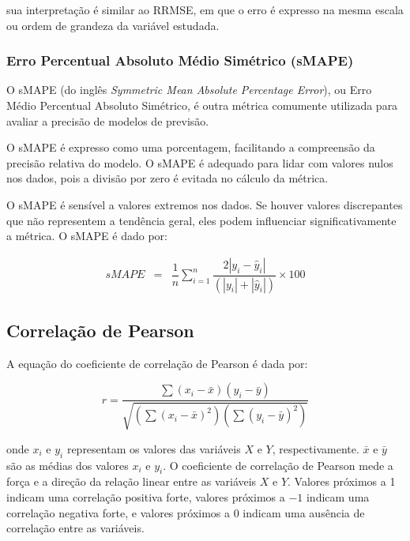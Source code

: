  \noindent sua interpretação é similar ao RRMSE, em que o erro é expresso na mesma escala ou ordem de grandeza da variável estudada.
 
 
 
 
 \subsubsection{Erro Percentual Absoluto M\'edio Sim\'etrico (sMAPE)}
 
 
 O sMAPE (do inglês \textit{Symmetric Mean Absolute Percentage Error}), ou Erro Médio Percentual Absoluto Simétrico, é outra métrica comumente utilizada para avaliar a precisão de modelos de previsão. 
 
 O sMAPE é expresso como uma porcentagem, facilitando a compreensão da precisão relativa do modelo.  O sMAPE é adequado para lidar com valores nulos nos dados, pois a divisão por zero é evitada no cálculo da métrica.
 
 
 O sMAPE é sensível a valores extremos nos dados. Se houver valores discrepantes que não representem a tendência geral, eles podem influenciar significativamente a métrica.	
 O sMAPE é dado por:
 
 
 
 \begin{eqnarray}
 	sMAPE &=& \dfrac{1}{n} \sum_{i=1}^{n} \dfrac{2|y_i - \hat{y}_i|}{(|y_i| + |\hat{y}_i|)} \times 100\label{eq:smape}
 \end{eqnarray}
 
 
 
 
 \subsection{Correla\c c\~ao de Pearson}
 
 A equação do coeficiente de correlação de Pearson é dada por:
 
 \begin{equation}
 	r=\frac{\sum\left(x_i-\bar{x}\right)\left(y_i-\bar{y}\right)}{\sqrt{\left(\sum\left(x_i-\bar{x}\right)^2\right)\left(\sum\left(y_i-\bar{y}\right)^2\right)}}
 \end{equation}
 
 \noindent onde $x_i$ e $y_i$ representam os valores das variáveis $X$ e $Y$, respectivamente. $\bar{x}$ e $\bar{y}$ são as médias dos valores $x_i$ e $y_i$. O coeficiente de correlação de Pearson mede a força e a direção da relação linear entre as variáveis $X$ e $Y$. Valores próximos a 1 indicam uma correlação positiva forte, valores próximos a $-1$ indicam uma correlação negativa forte, e valores próximos a $0$ indicam uma ausência de correlação entre as variáveis.
 
